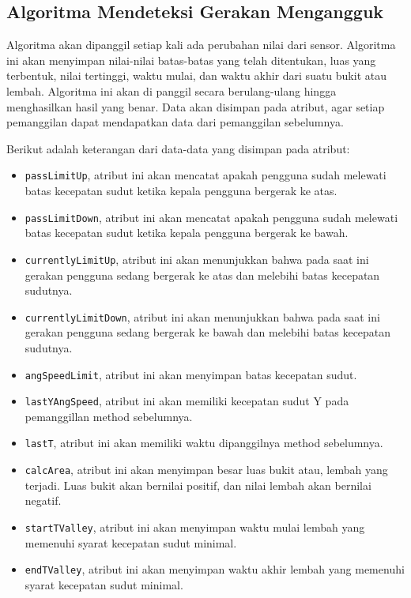 \subsection{Algoritma Mendeteksi Gerakan Mengangguk}
\label{ssec:algoritme_mendeteksi_gerakan_mengangguk}

Algoritma akan dipanggil setiap kali ada perubahan nilai dari sensor. Algoritma ini akan menyimpan nilai-nilai batas-batas yang telah ditentukan, luas yang terbentuk, nilai tertinggi, waktu mulai, dan waktu akhir dari suatu bukit atau lembah. Algoritma ini akan di panggil secara berulang-ulang hingga menghasilkan hasil yang benar. Data akan disimpan pada atribut, agar setiap pemanggilan dapat mendapatkan data dari pemanggilan sebelumnya. 

Berikut adalah keterangan dari data-data yang disimpan pada atribut:
\begin{itemize}
	\item \texttt{passLimitUp}, atribut ini akan mencatat apakah pengguna sudah melewati batas kecepatan sudut ketika kepala pengguna bergerak ke atas.
	\item \texttt{passLimitDown}, atribut ini akan mencatat apakah pengguna sudah melewati batas kecepatan sudut ketika kepala pengguna bergerak ke bawah.
	\item \texttt{currentlyLimitUp}, atribut ini akan menunjukkan bahwa pada saat ini gerakan pengguna sedang bergerak ke atas dan melebihi batas kecepatan sudutnya.
	\item \texttt{currentlyLimitDown}, atribut ini akan menunjukkan bahwa pada saat ini gerakan pengguna sedang bergerak ke bawah dan melebihi batas kecepatan sudutnya.
	\item \texttt{angSpeedLimit}, atribut ini akan menyimpan batas kecepatan sudut.
	\item \texttt{lastYAngSpeed}, atribut ini akan memiliki kecepatan sudut Y pada pemanggillan method sebelumnya. 
	\item \texttt{lastT}, atribut ini akan memiliki waktu dipanggilnya method sebelumnya. 
	\item \texttt{calcArea}, atribut ini akan menyimpan besar luas bukit atau, lembah yang terjadi. Luas bukit akan bernilai positif, dan nilai lembah akan bernilai negatif. 
	\item \texttt{startTValley}, atribut ini akan menyimpan waktu mulai lembah yang memenuhi syarat kecepatan sudut minimal. 
	\item \texttt{endTValley}, atribut ini akan menyimpan waktu akhir lembah yang memenuhi syarat kecepatan sudut minimal.

\end{itemize}
